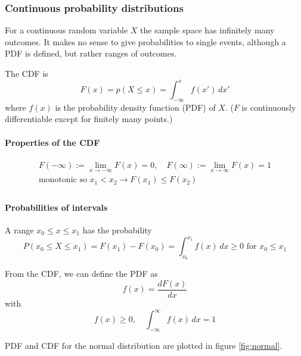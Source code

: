 \subsubsection{Continuous probability distributions}
For a continuous random variable $X$ the sample space has infinitely many outcomes.
It makes no sense to give probabilities to single events, although a PDF is defined,
but rather ranges of outcomes.

The CDF is
\begin{equation}
    F(x) = p(X \leq x) = \int_{-\infty}^{x} f(x') \, dx'
\end{equation}
where $f(x)$ is the probability density function (PDF) of $X$. ($F$ is
continuously differentiable except for finitely many points.)

\paragraph*{Properties of the CDF}
\begin{equation}
    \begin{gathered}
        F(-\infty) := \lim_{x \rightarrow -\infty} F(x) = 0, \quad F(\infty) := \lim_{x \rightarrow \infty} F(x) = 1 \\
        \text{monotonic so } x_1 < x_2 \rightarrow F(x_1) \leq F(x_2) \\
    \end{gathered}
\end{equation}

\paragraph*{Probabilities of intervals} A range $x_0 \leq x \leq x_1$ has the probability
\begin{equation}
    P(x_0 \leq X \leq x_1) = F(x_1) - F(x_0) = \int_{x_0}^{x_1} f(x) \, dx \geq 0 \text{ for } x_0 \leq x_1
\end{equation}

From the CDF, we can define the PDF as
\begin{equation}
    f(x) = \frac{dF(x)}{dx}
\end{equation}
with
\begin{equation}
    f(x) \geq 0, \quad \int_{-\infty}^{\infty} f(x) \, dx = 1
\end{equation}

PDF and CDF for the normal distribution are plotted in figure \ref{fig:normal}.

